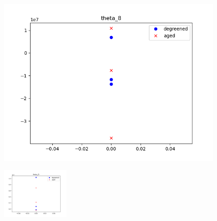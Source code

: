 \begin{figure}[H]
\begin{minipage}{0.3\textwidth}
                \includegraphics[width = \textwidth]{./figs/figs_new_mdl/theta_8.png}
        \end{minipage}
\end{figure}

\begin{figure}[H]
        \centering
        \includegraphics[width = 0.3\textwidth]{./figs/figs_new_mdl/theta_9.png}
\end{figure}
